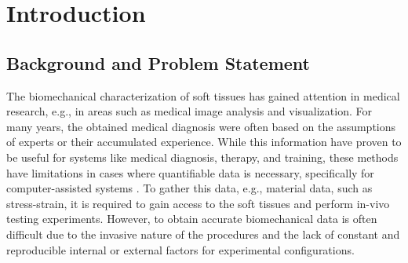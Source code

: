
\chapter{Introduction} %

\label{Chapter2} %

\section{Background and Problem Statement}
The biomechanical characterization of soft tissues has gained attention
in medical research, e.g., in areas such as medical image analysis and visualization.
For many years, the obtained medical diagnosis were often based on the assumptions of experts or 
their accumulated experience. While this information have proven to be useful for systems like
medical diagnosis, therapy, and training, these methods have limitations 
in cases where quantifiable data is necessary, specifically for computer-assisted systems \cite{Kauer2002}.
To gather this data, e.g., material data, such as stress-strain, it is required 
to gain access to the soft tissues and perform in-vivo testing experiments. 
However, to obtain accurate biomechanical data is often difficult 
due to the invasive nature of the procedures and the lack of constant and reproducible internal or external factors for 
experimental configurations.\\


